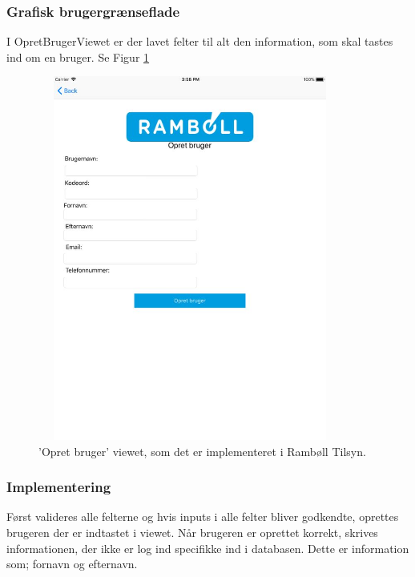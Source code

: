 \subsubsection{Grafisk brugergrænseflade}
I OpretBrugerViewet er der lavet felter til alt den information, som skal tastes ind om en bruger. Se Figur \ref{fig:OpretBrugerView}
\begin{figure}[H] %
	\centering
	\includegraphics[height=12cm, width=10cm]{Design/Applikation/OpretBruger/OpretBrugerView}
	\caption{'Opret bruger' viewet, som det er implementeret i Rambøll Tilsyn.}
	\label{fig:OpretBrugerView}
\end{figure}

\subsubsection{Implementering}
Først valideres alle felterne og hvis inputs i alle felter bliver godkendte, oprettes brugeren der er indtastet i viewet. Når brugeren er oprettet korrekt, skrives informationen, der ikke er log ind specifikke ind i databasen. Dette er information som; fornavn og efternavn.


\clearpage